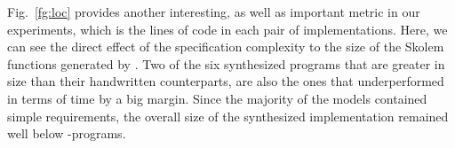 Fig.~\ref{fg:loc} provides another interesting, as well as important metric in
our experiments, which is the lines of code in each pair of implementations.
Here, we can see the direct effect of the specification complexity to the size
of the Skolem functions generated by \aeval. Two of the six synthesized
programs that are greater in size than their handwritten counterparts, are also
the ones that underperformed in terms of time by a big margin. Since the
majority of the models contained simple requirements, the overall size of the synthesized implementation remained well below \lustrev-programs.
%


